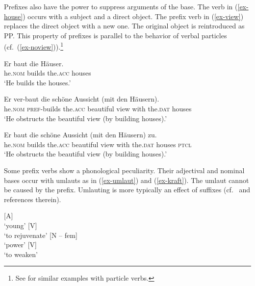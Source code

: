 \documentclass[output=paper
  ,nobabel
  ,draftmode
  ,colorlinks, citecolor=brown
]{langscibook}
\begin{document}
\noindent Prefixes also have the power to suppress arguments of the base. The verb in (\ref{ex-house}) occurs with a subject and a direct object. The prefix verb in (\ref{ex-view}) replaces the direct object with a new one. The original object is reintroduced as PP. This property of prefixes is parallel to the behavior of verbal particles (cf.\ (\ref{ex-noview})).\footnote{See \citet{Hoekstra1988} for similar examples with  particle verbs.}

\eal
\ex\label{ex-house}
\gll Er baut die Häuser. \\
	he.\textsc{nom} builds the.\textsc{acc} houses\\
\glt	`He builds the houses.'

\ex\label{ex-view}
\gll Er ver-baut die schöne Aussicht (mit den Häusern). \\
	he.\textsc{nom} \textsc{pref}-builds the.\textsc{acc} beautiful view with   the.\textsc{dat}   houses \\
\glt `He obstructs the beautiful view (by building houses).'

\ex\label{ex-noview}
\gll Er              baut   die            schöne      Aussicht    (mit    den           Häusern)   zu.\\
     he.\textsc{nom}   builds   the.\textsc{acc}   beautiful   view           with the.\textsc{dat} houses \textsc{ptcl} \\
\glt	`He obstructs the beautiful view (by building houses).'
\zl

\noindent 
Some prefix verbs show a phonological peculiarity. Their adjectival and nominal bases occur with
umlauts as in (\ref{ex-umlaut}) and (\ref{ex-kraft}). The umlaut cannot be caused by the
prefix. Umlauting is more typically an effect of suffixes (cf.\ \citealt[101]{Eschenlohr1999} and references therein).

\begin{exe}
\ex
  \begin{xlist}
\label{ex-umlaut}
\ex\label{jüng}  [A]\\`young'
\ex {} [V]\\`to rejuvenate'
\zl
\eal 
\label{ex-kraft}
\ex{} [N -- fem]\\`power'
\ex {} [V]\\`to weaken'
\end{xlist}
\end{exe}
\end{document}
